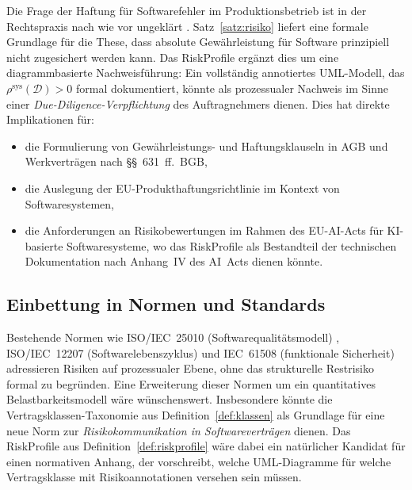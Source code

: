﻿\documentclass[a4paper,12pt]{article}
\theoremstyle{definition}
\begin{document}
Die Frage der Haftung f\"ur Softwarefehler im Produktionsbetrieb ist in der Rechtspraxis
nach wie vor ungekl\"art \cite{kilian2017}. Satz~\ref{satz:risiko} liefert eine formale
Grundlage f\"ur die These, dass absolute Gew\"ahrleistung f\"ur Software prinzipiell
nicht zugesichert werden kann. Das \textsf{RiskProfile} erg\"anzt dies um eine
diagrammbasierte Nachweisf\"uhrung: Ein vollst\"andig annotiertes UML-Modell, das
$\rho^{\mathrm{sys}}(\mathcal{D}) > 0$ formal dokumentiert, k\"onnte als
prozessualer Nachweis im Sinne einer \emph{Due-Diligence-Verpflichtung} des
Auftragnehmers dienen. Dies hat direkte Implikationen f\"ur:
\begin{itemize}
    \item die Formulierung von Gew\"ahrleistungs- und Haftungsklauseln in AGB und
          Werkvertr\"agen nach \S\S~631~ff.\ BGB,
    \item die Auslegung der EU-Produkthaftungsrichtlinie im Kontext von Softwaresystemen,
    \item die Anforderungen an Risikobewertungen im Rahmen des EU-AI-Acts \cite{euai2024}
          f\"ur KI-basierte Softwaresysteme, wo das \textsf{RiskProfile} als Bestandteil
          der technischen Dokumentation nach Anhang~IV des AI~Acts dienen k\"onnte.
\end{itemize}

\subsection{Einbettung in Normen und Standards}

Bestehende Normen wie ISO/IEC~25010 (Softwarequalit\"atsmodell) \cite{iso25010},
ISO/IEC~12207 (Softwarelebenszyklus) und IEC~61508 (funktionale Sicherheit) adressieren
Risiken auf prozessualer Ebene, ohne das strukturelle Restrisiko formal zu begr\"unden.
Eine Erweiterung dieser Normen um ein quantitatives Belastbarkeitsmodell w\"are
w\"unschenswert. Insbesondere k\"onnte die Vertragsklassen-Taxonomie aus
Definition~\ref{def:klassen} als Grundlage f\"ur eine neue Norm zur \emph{Risikokommunikation
in Softwarevertr\"agen} dienen. Das \textsf{RiskProfile} aus Definition~\ref{def:riskprofile}
w\"are dabei ein nat\"urlicher Kandidat f\"ur einen normativen Anhang, der vorschreibt,
welche UML-Diagramme f\"ur welche Vertragsklasse mit Risikoannotationen versehen sein m\"ussen.
\end{document}

